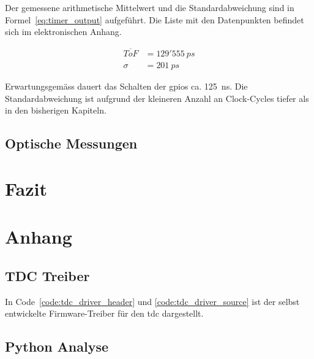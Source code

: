 \documentclass[11pt,a4paper,hidelinks]{article}
\begin{document}
Der gemessene arithmetische Mittelwert und die Standardabweichung sind in Formel~\ref{eq:timer_output} aufgeführt.  Die
Liste mit den Datenpunkten befindet sich im elektronischen Anhang.

\begin{equation}\label{eq:timer_output}
    \begin{split}
        \overline{ToF} &=129'555~ps\\
        \sigma         &= 201~ps
    \end{split}
\end{equation}

Erwartungsgemäss dauert das Schalten der \acrshort{gpio}s ca. 125~ns. Die Standardabweichung ist aufgrund der kleineren
Anzahl an Clock-Cycles tiefer als in den bisherigen Kapiteln.


\pagebreak

\subsection{Optische Messungen}


\pagebreak

\section{Fazit}

\pagebreak

\section{Anhang}

\subsection{TDC Treiber}\label{sec:tdc_driver}

In Code~\ref{code:tdc_driver_header} und \ref{code:tdc_driver_source} ist der selbst entwickelte Firmware-Treiber für
den \acrshort{tdc} dargestellt.




\subsection{Python Analyse}\label{sec:python_analyze}
\end{document}
